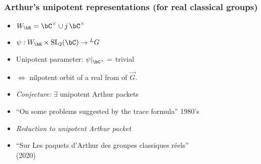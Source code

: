 \documentclass[t,mathserif,11pt]{beamer}
\theoremstyle{plain}
\theoremstyle{definition}
\def\SL{{\mathrm{SL}}}
\def\Irr{{\mathrm{Irr}}}
\def\vG{{\overrightarrow{G}}}
\def\blue{\color{blue}}
\let\oldemph\emph
\def\emph#1{\oldemph{\blue #1}}
\begin{document}

    \begin{frame}
      \frametitle{Arthur's unipotent representations (for real classical groups)}
      \begin{itemize}[<+->]
        \item $W_{\bR} = \bC^{\times} \cup j\, \bC^{\times}$
        \item $\psi:W_{\bR}\times \SL_{2}(\bC)\rightarrow {}^{L} G $
        \item Unipotent parameter: %
              $\psi|_{\bC^\times}=$ trivial
        \item[] $\Leftrightarrow$ nilpotent orbit of a real from of $\vG$.
        \item {}  \emph{Conjecture:} $\exists$ unipotent Arthur
        packets
        \item[] ``On some problems suggested
        by the trace formula'' 1980's
        \item {}
              \emph{Reduction to unipotent Arthur packet}
        \item[] ``Sur Les paquets d'Arthur des groupes classiques r\'eels''\\
        (2020)
      \end{itemize}
    \end{frame}
\end{document}
